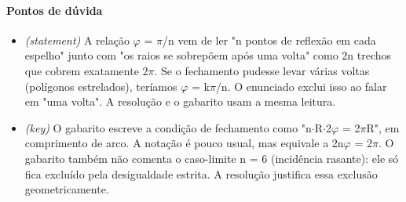 \documentclass{article}%
\begin{document}
\paragraph{Pontos de dúvida}%
\begin{itemize}%
\item%
\textit{(statement)} A relação $\varphi$ = $\pi$/n vem de ler "n pontos de reflexão em cada espelho" junto com "os raios se sobrepõem após uma volta" como 2n trechos que cobrem exatamente 2$\pi$. Se o fechamento pudesse levar várias voltas (polígonos estrelados), teríamos $\varphi$ = k$\pi$/n. O enunciado exclui isso ao falar em "uma volta". A resolução e o gabarito usam a mesma leitura.%
\item%
\textit{(key)} O gabarito escreve a condição de fechamento como "n$\cdot$R$\cdot$2$\varphi$ = 2$\pi$R", em comprimento de arco. A notação é pouco usual, mas equivale a 2n$\varphi$ = 2$\pi$. O gabarito também não comenta o caso{-}limite n = 6 (incidência rasante): ele só fica excluído pela desigualdade estrita. A resolução justifica essa exclusão geometricamente.%
\end{itemize}%
\end{document}
